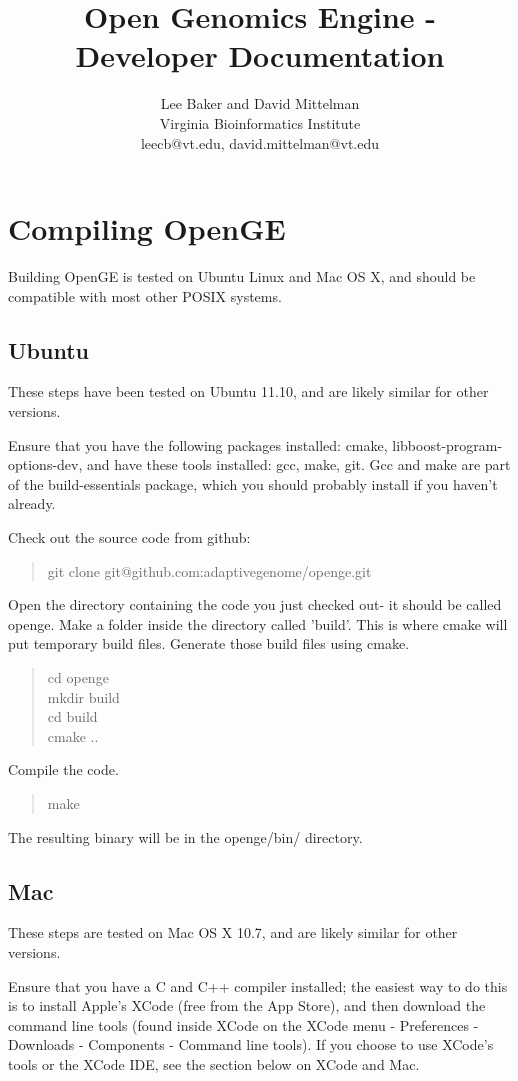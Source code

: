 \documentclass[11pt]{article}
\newcommand {\cmd}[1] {\begin{quote}#1\end{quote}}
\begin{document}
\title{Open Genomics Engine - Developer Documentation}
\author{Lee Baker and David Mittelman\\
Virginia Bioinformatics Institute \\
leecb@vt.edu, david.mittelman@vt.edu}
\maketitle

\section {Compiling OpenGE}
Building OpenGE is tested on Ubuntu Linux and Mac OS X, and should be compatible with most other POSIX systems.

\subsection{Ubuntu}
These steps have been tested on Ubuntu 11.10, and are likely similar for other versions.

Ensure that you have the following packages installed: cmake, libboost-program-options-dev, and have these tools installed: gcc, make, git. Gcc and make are part of the build-essentials package, which you should probably install if you haven't already.

Check out the source code from github:
\cmd{git clone git@github.com:adaptivegenome/openge.git}

Open the directory containing the code you just checked out- it should be called openge. Make a folder inside the directory called 'build'. This is where cmake will put temporary build files. Generate those build files using cmake.
\cmd{cd openge\\mkdir build\\cd build\\cmake ..}

Compile the code.
\cmd{make}
The resulting binary will be in the openge/bin/ directory.

\subsection{Mac}
These steps are tested on Mac OS X 10.7, and are likely similar for other versions.

Ensure that you have a C and C++ compiler installed; the easiest way to do this is to install Apple's XCode (free from the App Store), and then download the command line tools (found inside XCode on the XCode menu - Preferences - Downloads - Components - Command line tools). If you choose to use XCode's tools or the XCode IDE, see the section below on XCode and Mac.
\end{document}
